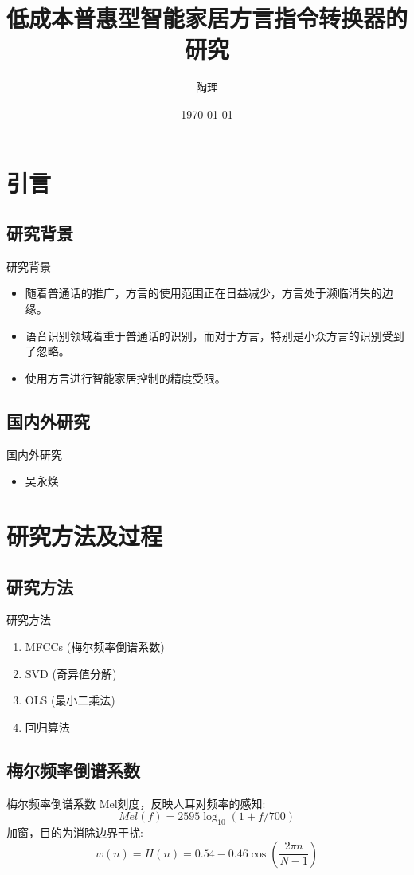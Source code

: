 \documentclass{beamer}
\title{低成本普惠型智能家居方言指令转换器的研究}
\author{陶理}
\date{\today}
\begin{document}
\maketitle
\section{引言}
\subsection{研究背景}
\begin{frame}{研究背景}
    \begin{itemize}
        \item 随着普通话的推广，方言的使用范围正在日益减少，方言处于濒临消失的边缘。
        \item 语音识别领域着重于普通话的识别，而对于方言，特别是小众方言的识别受到了忽略。
        \item 使用方言进行智能家居控制的精度受限。
    \end{itemize}
\end{frame}
\subsection{国内外研究} 
\begin{frame}{国内外研究}
    \begin{itemize}
        \item 吴永焕\cite{WuYonghuan}
    \end{itemize}
\end{frame}
\section{研究方法及过程}
\subsection{研究方法}
\begin{frame}{研究方法}
    \begin{enumerate}
        \item MFCCs (梅尔频率倒谱系数)
        \item SVD (奇异值分解)
        \item OLS (最小二乘法)
        \item 回归算法
    \end{enumerate}
\end{frame}
\subsection{梅尔频率倒谱系数}
\begin{frame}{梅尔频率倒谱系数}
    Mel刻度，反映人耳对频率的感知:
    \begin{equation}
        Mel(f) = 2595 \log_{10}(1+f/700)
    \end{equation}
    加窗，目的为消除边界干扰:
    \begin{equation}
        w(n) = H(n) = 0.54 - 0.46 \cos \left( \frac{2\pi n}{N-1} \right)
    \end{equation}
\end{frame}
\end{document}
